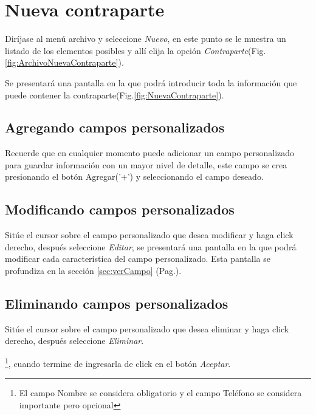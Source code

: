 \section{Nueva contraparte}
\label{sec:nuevaContraparte}
Dir\'ijase al men\'u archivo y seleccione \emph{Nuevo}, en este punto se le muestra un listado de los elementos posibles y
all\'i elija la opci\'on \emph{Contraparte}(Fig.\ref{fig:ArchivoNuevaContraparte}). 
  

Se presentar\'a una pantalla en la que podr\'a introducir toda la informaci\'on
que puede contener la contraparte(Fig.\ref{fig:NuevaContraparte}). 
  

\subsection{Agregando campos personalizados}
\label{sec:agregarCamposContraparte}
Recuerde que en cualquier momento puede adicionar un campo personalizado para guardar informaci\'on con un mayor nivel de detalle, este campo se crea presionando el bot\'on Agregar('+') y seleccionando el campo deseado.

\subsection{Modificando campos personalizados}
\label{sec:modificarCamposContraparte}
Sit\'ue el cursor sobre el campo personalizado que desea modificar y haga click derecho, despu\'es seleccione \emph{Editar},
se presentar\'a una pantalla en la que podr\'a modificar cada caracter\'istica
del campo personalizado. Esta pantalla se profundiza en la secci\'on
\ref{sec:verCampo} (Pag.\pageref{sec:verCampo}).

\subsection{Eliminando campos personalizados}
\label{sec:eliminarCamposContraparte}
Sit\'ue el cursor sobre el campo personalizado que desea eliminar y haga click derecho, despu\'es seleccione \emph{Eliminar}.

\footnote{El campo Nombre se considera obligatorio y el campo Tel\'efono se
considera importante pero opcional},
cuando termine de ingresarla de click en el bot\'on \emph{Aceptar}.